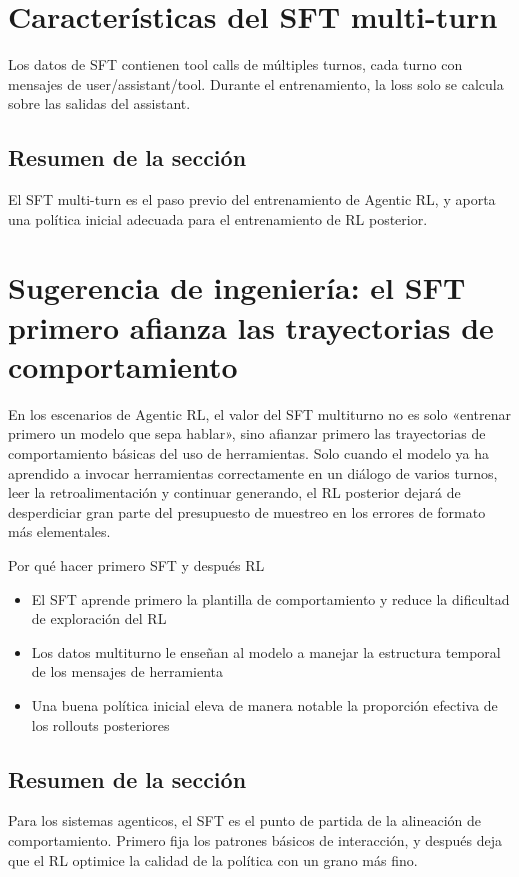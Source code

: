 \documentclass[a4paper]{article}
\begin{document}
\section{Características del SFT multi-turn}
Los datos de SFT contienen tool calls de múltiples turnos, cada turno con mensajes de user/assistant/tool. Durante el entrenamiento, la loss solo se calcula sobre las salidas del assistant.

\subsection{Resumen de la sección}
El SFT multi-turn es el paso previo del entrenamiento de Agentic RL, y aporta una política inicial adecuada para el entrenamiento de RL posterior.

\newpage
\section{Sugerencia de ingeniería: el SFT primero afianza las trayectorias de comportamiento}
En los escenarios de Agentic RL, el valor del SFT multiturno no es solo «entrenar primero un modelo que sepa hablar», sino afianzar primero las trayectorias de comportamiento básicas del uso de herramientas. Solo cuando el modelo ya ha aprendido a invocar herramientas correctamente en un diálogo de varios turnos, leer la retroalimentación y continuar generando, el RL posterior dejará de desperdiciar gran parte del presupuesto de muestreo en los errores de formato más elementales.

\begin{knowledgebox}{Por qué hacer primero SFT y después RL}
\begin{itemize}
  \item El SFT aprende primero la plantilla de comportamiento y reduce la dificultad de exploración del RL
  \item Los datos multiturno le enseñan al modelo a manejar la estructura temporal de los mensajes de herramienta
  \item Una buena política inicial eleva de manera notable la proporción efectiva de los rollouts posteriores
\end{itemize}
\end{knowledgebox}

\subsection{Resumen de la sección}
Para los sistemas agenticos, el SFT es el punto de partida de la alineación de comportamiento. Primero fija los patrones básicos de interacción, y después deja que el RL optimice la calidad de la política con un grano más fino.
\end{document}
